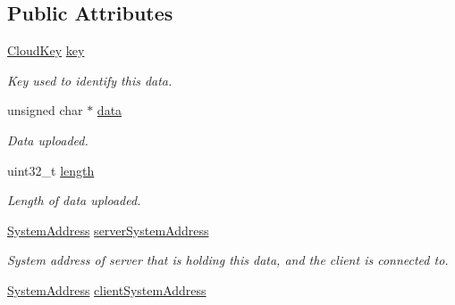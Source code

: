 \subsection*{Public Attributes}
\begin{DoxyCompactItemize}
\item 
\hypertarget{struct_rak_net_1_1_cloud_query_row_a6bbc7fc0b2a1e26f91560e9ce5e4e438}{\hyperlink{struct_rak_net_1_1_cloud_key}{Cloud\-Key} \hyperlink{struct_rak_net_1_1_cloud_query_row_a6bbc7fc0b2a1e26f91560e9ce5e4e438}{key}}\label{struct_rak_net_1_1_cloud_query_row_a6bbc7fc0b2a1e26f91560e9ce5e4e438}

\begin{DoxyCompactList}\small\item\em Key used to identify this data. \end{DoxyCompactList}\item 
\hypertarget{struct_rak_net_1_1_cloud_query_row_adfb3a5f46eae6f8649618757dbc77022}{unsigned char $\ast$ \hyperlink{struct_rak_net_1_1_cloud_query_row_adfb3a5f46eae6f8649618757dbc77022}{data}}\label{struct_rak_net_1_1_cloud_query_row_adfb3a5f46eae6f8649618757dbc77022}

\begin{DoxyCompactList}\small\item\em Data uploaded. \end{DoxyCompactList}\item 
\hypertarget{struct_rak_net_1_1_cloud_query_row_af8567ff13b08163e4e0fb5752c29ed3d}{uint32\-\_\-t \hyperlink{struct_rak_net_1_1_cloud_query_row_af8567ff13b08163e4e0fb5752c29ed3d}{length}}\label{struct_rak_net_1_1_cloud_query_row_af8567ff13b08163e4e0fb5752c29ed3d}

\begin{DoxyCompactList}\small\item\em Length of data uploaded. \end{DoxyCompactList}\item 
\hypertarget{struct_rak_net_1_1_cloud_query_row_a79783e323ecc9772e41c436e48b57dd7}{\hyperlink{struct_rak_net_1_1_system_address}{System\-Address} \hyperlink{struct_rak_net_1_1_cloud_query_row_a79783e323ecc9772e41c436e48b57dd7}{server\-System\-Address}}\label{struct_rak_net_1_1_cloud_query_row_a79783e323ecc9772e41c436e48b57dd7}

\begin{DoxyCompactList}\small\item\em System address of server that is holding this data, and the client is connected to. \end{DoxyCompactList}\item 
\hypertarget{struct_rak_net_1_1_cloud_query_row_aeba40c1a131ee9e8c7535568fad9466a}{\hyperlink{struct_rak_net_1_1_system_address}{System\-Address} \hyperlink{struct_rak_net_1_1_cloud_query_row_aeba40c1a131ee9e8c7535568fad9466a}{client\-System\-Address}}\label{struct_rak_net_1_1_cloud_query_row_aeba40c1a131ee9e8c7535568fad9466a}


\end{DoxyCompactItemize}
